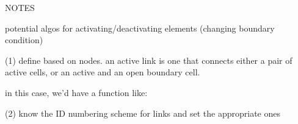 \documentclass[12pt]{amsart}
\begin{document}

NOTES

potential algos for activating/deactivating elements (changing boundary condition)

(1) define based on nodes. an active link is one that connects either a pair of active cells, or an active and an open boundary cell.

in this case, we'd have a function like:

%	
			
(2) know the ID numbering scheme for links and set the appropriate ones

	
			
\end{document}
